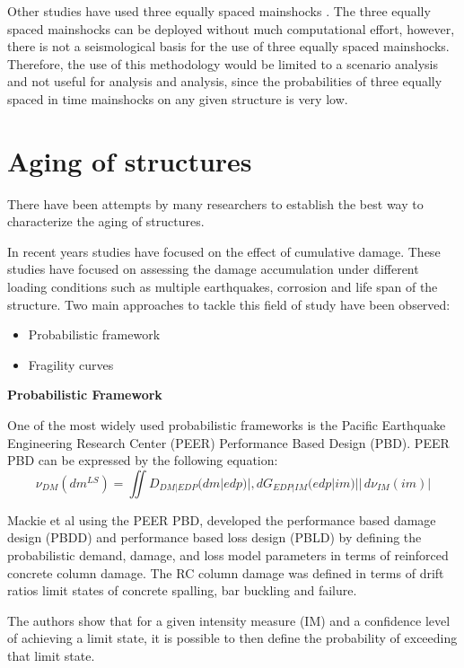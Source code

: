 Other studies have used three equally spaced mainshocks \cite{Hatzigeorgiou2009}. The three equally spaced mainshocks can be deployed without much computational effort, however, there is not a seismological basis for the use of three equally spaced mainshocks. Therefore, the use of this methodology would be limited to a scenario analysis and not useful for analysis and analysis, since the probabilities of three equally spaced in time mainshocks on any given structure is very low.

\section{Aging of structures}

There have been attempts by many researchers to establish the best way to characterize the aging of structures.

In recent years studies have focused on the effect of cumulative damage. These studies have focused on assessing the damage accumulation under different loading conditions such as multiple earthquakes, corrosion and life span of the structure. Two main approaches to tackle this field of study have been observed:

\begin{itemize}
	\item Probabilistic framework
	\item Fragility curves
\end{itemize}

\textbf{Probabilistic Framework}

One of the most widely used probabilistic frameworks is the Pacific Earthquake Engineering Research Center (PEER) Performance Based Design (PBD). PEER PBD can be expressed by the following equation:
\begin{equation}
\nu_{DM}(dm^{LS})=\iint D_{DM|EDP}(dm|edp)|,dG_{EDP|IM}(edp|im)||\,d\nu_{IM}(im)|
\end{equation}

Mackie et al \cite{Mackie2007} using  the PEER PBD, developed the performance based damage design (PBDD) and performance based loss design (PBLD) by defining the probabilistic demand, damage, and loss model parameters in terms of reinforced concrete column damage. The RC column damage was defined in terms of drift ratios limit states of concrete spalling, bar buckling and failure. 

The authors show that for a given intensity measure (IM) and a confidence level of achieving a limit state, it is possible to then define the probability  of exceeding that limit state.

